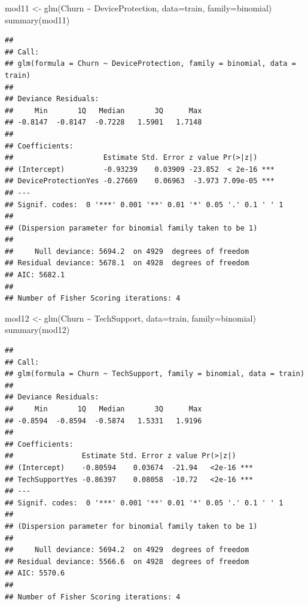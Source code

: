 \documentclass[
  twoside]{article}
\newenvironment{Shaded}{\begin{snugshade}}{\end{snugshade}}
\newcommand{\AttributeTok}[1]{\textcolor[rgb]{0.77,0.63,0.00}{#1}}
\newcommand{\FunctionTok}[1]{\textcolor[rgb]{0.00,0.00,0.00}{#1}}
\newcommand{\NormalTok}[1]{#1}
\newcommand{\OtherTok}[1]{\textcolor[rgb]{0.56,0.35,0.01}{#1}}
\newcommand{\SpecialCharTok}[1]{\textcolor[rgb]{0.00,0.00,0.00}{#1}}
\begin{document}
\begin{Shaded}
\begin{Highlighting}[]
\NormalTok{mod11 }\OtherTok{\textless{}{-}} \FunctionTok{glm}\NormalTok{(Churn }\SpecialCharTok{\textasciitilde{}}\NormalTok{ DeviceProtection, }\AttributeTok{data=}\NormalTok{train, }\AttributeTok{family=}\NormalTok{binomial)}
\FunctionTok{summary}\NormalTok{(mod11)}
\end{Highlighting}
\end{Shaded}

\begin{verbatim}
## 
## Call:
## glm(formula = Churn ~ DeviceProtection, family = binomial, data = train)
## 
## Deviance Residuals: 
##     Min       1Q   Median       3Q      Max  
## -0.8147  -0.8147  -0.7228   1.5901   1.7148  
## 
## Coefficients:
##                     Estimate Std. Error z value Pr(>|z|)    
## (Intercept)         -0.93239    0.03909 -23.852  < 2e-16 ***
## DeviceProtectionYes -0.27669    0.06963  -3.973 7.09e-05 ***
## ---
## Signif. codes:  0 '***' 0.001 '**' 0.01 '*' 0.05 '.' 0.1 ' ' 1
## 
## (Dispersion parameter for binomial family taken to be 1)
## 
##     Null deviance: 5694.2  on 4929  degrees of freedom
## Residual deviance: 5678.1  on 4928  degrees of freedom
## AIC: 5682.1
## 
## Number of Fisher Scoring iterations: 4
\end{verbatim}

\begin{Shaded}
\begin{Highlighting}[]
\NormalTok{mod12 }\OtherTok{\textless{}{-}} \FunctionTok{glm}\NormalTok{(Churn }\SpecialCharTok{\textasciitilde{}}\NormalTok{ TechSupport, }\AttributeTok{data=}\NormalTok{train, }\AttributeTok{family=}\NormalTok{binomial)}
\FunctionTok{summary}\NormalTok{(mod12)}
\end{Highlighting}
\end{Shaded}

\begin{verbatim}
## 
## Call:
## glm(formula = Churn ~ TechSupport, family = binomial, data = train)
## 
## Deviance Residuals: 
##     Min       1Q   Median       3Q      Max  
## -0.8594  -0.8594  -0.5874   1.5331   1.9196  
## 
## Coefficients:
##                Estimate Std. Error z value Pr(>|z|)    
## (Intercept)    -0.80594    0.03674  -21.94   <2e-16 ***
## TechSupportYes -0.86397    0.08058  -10.72   <2e-16 ***
## ---
## Signif. codes:  0 '***' 0.001 '**' 0.01 '*' 0.05 '.' 0.1 ' ' 1
## 
## (Dispersion parameter for binomial family taken to be 1)
## 
##     Null deviance: 5694.2  on 4929  degrees of freedom
## Residual deviance: 5566.6  on 4928  degrees of freedom
## AIC: 5570.6
## 
## Number of Fisher Scoring iterations: 4
\end{verbatim}
\end{document}
